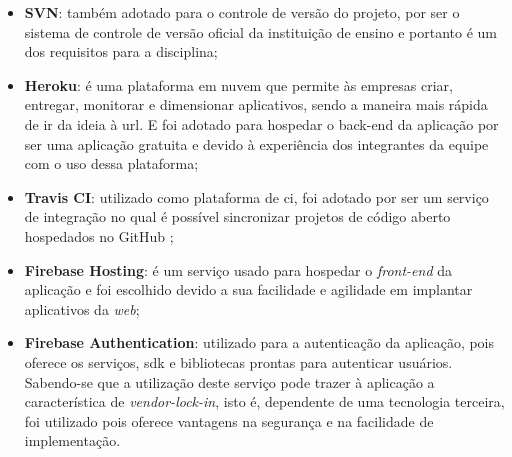 \begin{itemize}
\item{\textbf{SVN}}: também adotado para o controle de versão do projeto, por ser o sistema de controle de versão oficial da instituição de ensino e portanto é um dos requisitos para a disciplina;

\item{\textbf{Heroku}}: é uma plataforma em nuvem que permite às empresas criar, entregar, monitorar e dimensionar aplicativos, sendo a maneira mais rápida de ir da ideia à \ac{url}. E foi adotado para hospedar o back-end da aplicação por ser uma aplicação gratuita e devido à experiência dos integrantes da equipe com o uso dessa plataforma;

\item{\textbf{Travis CI}}: utilizado como plataforma de \ac{ci}, foi adotado por ser um serviço de integração no qual é possível sincronizar projetos de código aberto hospedados no GitHub \cite{travis:2021};

\item{\textbf{Firebase Hosting}}: é um serviço usado para hospedar o  \textit{\gls{front-end}} da aplicação e foi escolhido devido a sua facilidade e agilidade em implantar aplicativos da \textit{\gls{web}};

\item{\textbf{Firebase Authentication}}: utilizado para a autenticação da aplicação, pois oferece os serviços, \ac{sdk} e bibliotecas prontas para autenticar usuários. Sabendo-se que a utilização deste serviço pode trazer à aplicação a característica de \textit{\gls{vendor-lock-in}}, isto é, dependente de uma tecnologia terceira, foi utilizado pois oferece vantagens na segurança e na facilidade de implementação.  
\end{itemize}